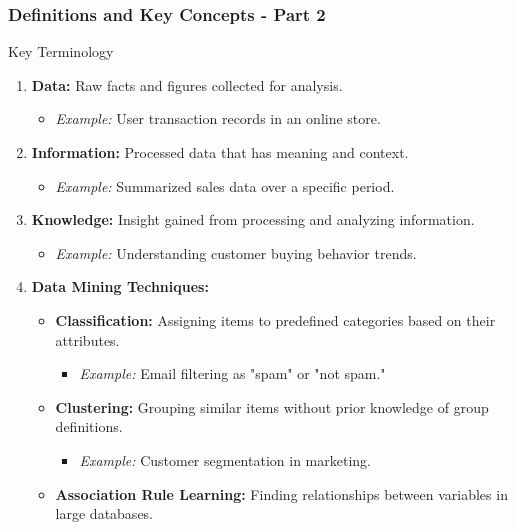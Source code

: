 \documentclass[aspectratio=169]{beamer}
\begin{document}
\begin{frame}[fragile]
    \frametitle{Definitions and Key Concepts - Part 2}
    \begin{block}{Key Terminology}
        \begin{enumerate}
            \item \textbf{Data:} Raw facts and figures collected for analysis. 
                \begin{itemize}
                    \item \textit{Example:} User transaction records in an online store.
                \end{itemize}
            \item \textbf{Information:} Processed data that has meaning and context. 
                \begin{itemize}
                    \item \textit{Example:} Summarized sales data over a specific period.
                \end{itemize}
            \item \textbf{Knowledge:} Insight gained from processing and analyzing information. 
                \begin{itemize}
                    \item \textit{Example:} Understanding customer buying behavior trends.
                \end{itemize}
            \item \textbf{Data Mining Techniques:}
                \begin{itemize}
                    \item \textbf{Classification:} Assigning items to predefined categories based on their attributes. 
                        \begin{itemize}
                            \item \textit{Example:} Email filtering as "spam" or "not spam."
                        \end{itemize}
                    \item \textbf{Clustering:} Grouping similar items without prior knowledge of group definitions. 
                        \begin{itemize}
                            \item \textit{Example:} Customer segmentation in marketing.
                        \end{itemize}
                    \item \textbf{Association Rule Learning:} Finding relationships between variables in large databases. 

\end{itemize}
\end{enumerate}
\end{block}
\end{frame}
\end{document}
